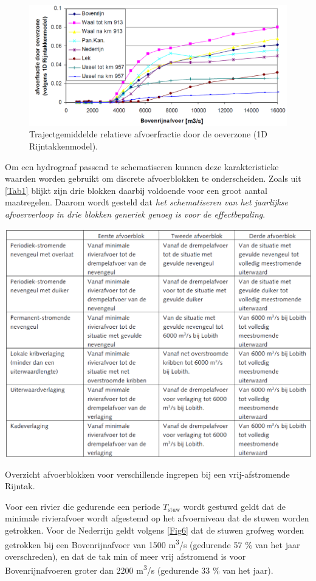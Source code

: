 \begin{figure}
\includegraphics[width=\columnwidth]{figures/Fig2b.png}
\caption{Trajectgemiddelde relatieve afvoerfractie door de oeverzone (1D Rijntakkenmodel).}
\label{Fig2b}
\end{figure}

Om een hydrograaf passend te schematiseren kunnen deze karakteristieke waarden worden gebruikt om discrete afvoerblokken te onderscheiden.
Zoals uit \autoref{Tab1} blijkt zijn drie blokken daarbij voldoende voor een groot aantal maatregelen.
Daarom wordt gesteld dat \emph{het schematiseren van het jaarlijkse afvoerverloop in drie blokken generiek genoeg is voor de effectbepaling}.

\begin{table}
\includegraphics[width=\columnwidth]{figures/Tab1a.png}
\caption{Overzicht afvoerblokken voor verschillende ingrepen bij een vrij-afstromende Rijntak.}
\label{Tab1}
\end{table}

Voor een rivier die gedurende een periode $T_\text{stuw}$ wordt gestuwd geldt dat de minimale rivierafvoer wordt afgestemd op het afvoerniveau dat de stuwen worden getrokken.
Voor de Nederrijn geldt volgens \autoref{Fig6} dat de stuwen grofweg worden getrokken bij een Bovenrijnafvoer van 1500 m\textsuperscript{3}/s (gedurende 57 \% van het jaar overschreden), en dat de tak min of meer vrij afstromend is voor Bovenrijnafvoeren groter dan 2200 m\textsuperscript{3}/s (gedurende 33 \% van het jaar).

